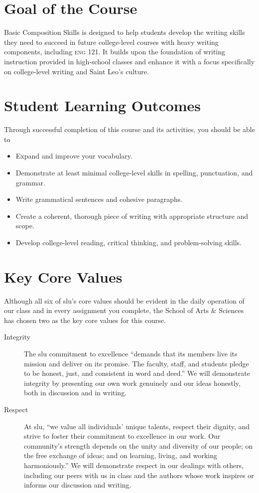 \documentclass[11pt,oneside]{amsart}	%
\begin{document}
\section{Goal of the Course} %
\label{sec:goal_of_the_course}
Basic Composition Skills is designed to help students develop the writing skills they need to succeed in future college-level courses with heavy writing components, including \textsc{eng} 121. It builds upon the foundation of writing instruction provided in high-school classes and enhance it with a focus specifically on college-level writing and Saint Leo's culture.


\section{Student Learning Outcomes}\label{outcomes}
Through successful completion of this course and its activities, you should be able to
\begin{itemize}
	\item Expand and improve your vocabulary.
	\item Demonstrate at least minimal college-level skills in spelling, punctuation, and grammar.
	\item Write grammatical sentences and cohesive paragraphs.
	\item Create a coherent, thorough piece of writing with appropriate structure and scope.
	\item Develop college-level reading, critical thinking, and problem-solving skills.
\end{itemize}

\section{Key Core Values} %
\label{sec:key_core_values}
Although all six of \ac{slu}'s core values should be evident in the daily operation of our class and in every assignment you complete, the School of Arts \& Sciences has chosen two as the key core values for this course.
\begin{description}
	\item [Integrity] The \ac{slu} commitment to excellence ``demands that its members live its mission and deliver on its promise. The faculty, staff, and students pledge to be honest, just, and consistent in word and deed.'' We will demonstrate integrity by presenting our own work genuinely and our ideas honestly, both in discussion and in writing.
	\item [Respect] At \ac{slu}, ``we value all individuals' unique talents, respect their dignity, and strive to foster their commitment to excellence in our work. Our community's strength depends on the unity and diversity of our people; on the free exchange of ideas; and on learning, living, and working harmoniously.'' We will demonstrate respect in our dealings with others, including our peers with us in class and the authors whose work inspires or informs our discussion and writing.
\end{description}
\end{document}
